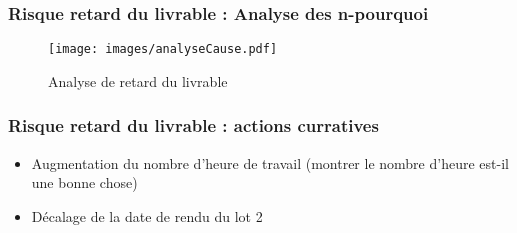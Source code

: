 \begin{frame}
\frametitle{Risque retard du livrable : Analyse des n-pourquoi}
	\begin{figure}[!h]
		\begin{center}
			\texttt{[image: images/analyseCause.pdf]}
			\caption{Analyse de retard du livrable}
		\end{center}
	\end{figure}
\end{frame}


\begin{frame}
\frametitle{Risque retard du livrable : actions curratives}
\begin{itemize}
\item Augmentation du nombre d'heure de travail (montrer le nombre d'heure est-il une bonne chose)
\item Décalage de la date de rendu du lot 2
\end{itemize}
\end{frame}


